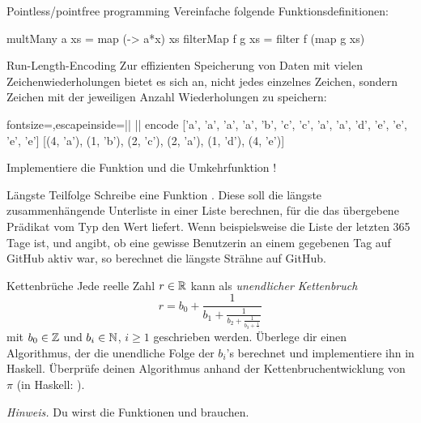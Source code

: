 \documentclass{uebblatt}
\begin{document}
\begin{aufgabe}{Pointless/pointfree programming}
  Vereinfache folgende Funktionsdefinitionen:
  \begin{haskellcode}
multMany a xs = map (\x -> a*x) xs
filterMap f g xs = filter f (map g xs)
  \end{haskellcode}
\end{aufgabe}

\begin{aufgabe}{Run-Length-Encoding}
  Zur effizienten Speicherung von Daten mit vielen Zeichenwiederholungen bietet es sich an, nicht jedes einzelnes Zeichen, sondern Zeichen mit der jeweiligen Anzahl Wiederholungen zu speichern:
  \begin{haskellcode*}{fontsize=\footnotesize,escapeinside=||}
|\ghci| encode ['a', 'a', 'a', 'a', 'b', 'c', 'c', 'a', 'a', 'd', 'e', 'e', 'e', 'e']
[(4, 'a'), (1, 'b'), (2, 'c'), (2, 'a'), (1, 'd'), (4, 'e')]
  \end{haskellcode*}
  Implementiere die Funktion  und die Umkehrfunktion !
\end{aufgabe}

\begin{aufgabe}{Längste Teilfolge}
  Schreibe eine Funktion .
  Diese soll die längste zusammenhängende Unterliste in einer Liste berechnen, für die das übergebene Prädikat vom Typ  den Wert  liefert. Wenn beispielsweise  die Liste der letzten 365 Tage ist, und  angibt, ob eine gewisse Benutzerin an einem gegebenen Tag auf GitHub aktiv war, so berechnet  die längste Strähne auf GitHub.
\end{aufgabe}

\begin{aufgabe}{Kettenbrüche}
  Jede reelle Zahl $r \in \mathbb{R}$ kann als \emph{unendlicher Kettenbruch}
  \[ r = b_0 + \frac{1}{b_1 + \frac{1}{b_2 + \frac{1}{b_3 + \tfrac{1}{\ddots}}}} \]
  mit $b_0 \in \mathbb{Z}$ und $b_i \in \mathbb{N}$, $i \geq 1$ geschrieben werden. Überlege dir einen Algorithmus, der die unendliche Folge der $b_i$'s berechnet und implementiere ihn in Haskell. Überprüfe deinen Algorithmus anhand der Kettenbruchentwicklung von $\pi$ (in Haskell: ). \\
  {\scriptsize \emph{Hinweis.} Du wirst die Funktionen  und  brauchen.\par}
\end{aufgabe}
\end{document}
